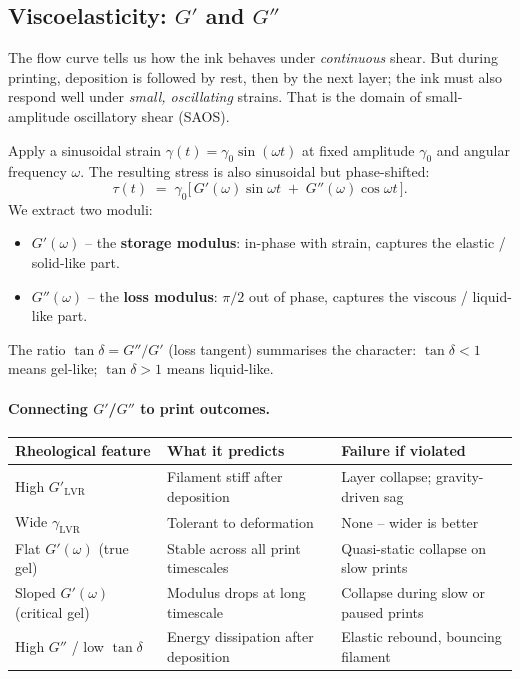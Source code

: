 \documentclass[11pt,a4paper]{article}
\begin{document}
\subsection{Viscoelasticity: $G'$ and $G''$}
\label{sec:saos}

The flow curve tells us how the ink behaves under \emph{continuous}
shear. But during printing, deposition is followed by rest, then by the
next layer; the ink must also respond well under \emph{small, oscillating}
strains. That is the domain of small-amplitude oscillatory shear (SAOS).

Apply a sinusoidal strain $\gamma(t)=\gamma_0\sin(\omega t)$ at fixed
amplitude $\gamma_0$ and angular frequency $\omega$. The resulting stress
is also sinusoidal but phase-shifted:
\begin{equation}
\tau(t) \;=\; \gamma_0\bigl[\,G'(\omega)\sin\omega t
\;+\; G''(\omega)\cos\omega t\,\bigr].
\label{eq:saos}
\end{equation}
We extract two moduli:
\begin{itemize}[leftmargin=1.6em,itemsep=2pt]
\item $G'(\omega)$ -- the \textbf{storage modulus}: in-phase with strain,
captures the elastic / solid-like part.
\item $G''(\omega)$ -- the \textbf{loss modulus}: $\pi/2$ out of phase,
captures the viscous / liquid-like part.
\end{itemize}

The ratio $\tan\delta = G''/G'$ (loss tangent) summarises the character:
$\tan\delta < 1$ means gel-like; $\tan\delta > 1$ means liquid-like.

\paragraph{Connecting $G'$/$G''$ to print outcomes.}

\begin{center}
\small
\begin{tabular}{p{3.5cm} p{4.5cm} p{5.5cm}}
\toprule
\textbf{Rheological feature} & \textbf{What it predicts} & \textbf{Failure if violated} \\
\midrule
High $G'_\mathrm{LVR}$ & Filament stiff after deposition & Layer collapse; gravity-driven sag \\
Wide $\gamma_\mathrm{LVR}$ & Tolerant to deformation & None -- wider is better \\
Flat $G'(\omega)$ (true gel) & Stable across all print timescales & Quasi-static collapse on slow prints \\
Sloped $G'(\omega)$ (critical gel) & Modulus drops at long timescale & Collapse during slow or paused prints \\
High $G''$ / low $\tan\delta$ & Energy dissipation after deposition & Elastic rebound, bouncing filament \\
\bottomrule
\end{tabular}
\end{center}
\end{document}
